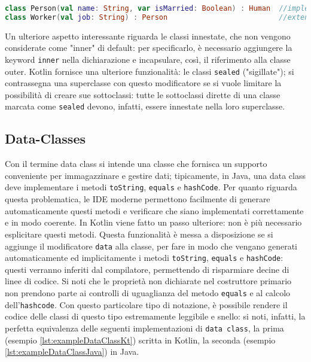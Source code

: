 \begin{lstlisting}[caption={Utilizzo della notazione "\texttt{:}"}, captionpos=b, label={lst:exampleEreditarietà}, language=Kotlin]
class Person(val name: String, var isMarried: Boolean) : Human  //implements
class Worker(val job: String) : Person                          //extends
\end{lstlisting}

Un ulteriore aspetto interessante riguarda le classi innestate, che non vengono considerate come "inner" di default: per specificarlo, è necessario aggiungere la keyword \texttt{inner} nella dichiarazione e incapsulare, così, il riferimento alla classe outer. Kotlin fornisce una ulteriore funzionalità: le classi \texttt{sealed} ("sigillate"); si contrassegna una superclasse con questo modificatore se si vuole limitare la possibilità di creare sue sottoclassi: tutte le sottoclassi dirette di una classe marcata come \texttt{sealed} devono, infatti, essere innestate nella loro superclasse.\\

\subsection{Data-Classes}
Con il termine data class si intende una classe che fornisca un supporto conveniente per immagazzinare e gestire dati; tipicamente, in Java, una data class deve implementare i metodi \texttt{toString}, \texttt{equals} e \texttt{hashCode}. Per quanto riguarda questa problematica, le IDE moderne permettono facilmente di generare automaticamente questi metodi e verificare che siano implementati correttamente e in modo coerente. In Kotlin viene fatto un passo ulteriore: non è più necessario esplicitare questi metodi. Questa funzionalità è messa a disposizione se si aggiunge il modificatore \texttt{data} alla classe, per fare in modo che vengano generati automaticamente ed implicitamente i metodi \texttt{toString}, \texttt{equals} e \texttt{hashCode}: questi verranno inferiti dal compilatore, permettendo di risparmiare decine di linee di codice. Si noti che le proprietà non dichiarate nel costruttore primario non prendono parte ai controlli di uguaglianza del metodo \texttt{equals} e al calcolo dell’\texttt{hashcode}.
Con questo particolare tipo di notazione, è possibile rendere il codice delle classi di questo tipo estremamente leggibile e snello: si noti, infatti, la perfetta equivalenza delle seguenti implementazioni di \texttt{data class}, la prima (esempio \ref{lst:exampleDataClassKt}) scritta in Kotlin, la seconda (esempio \ref{lst:exampleDataClassJava}) in Java.\\

